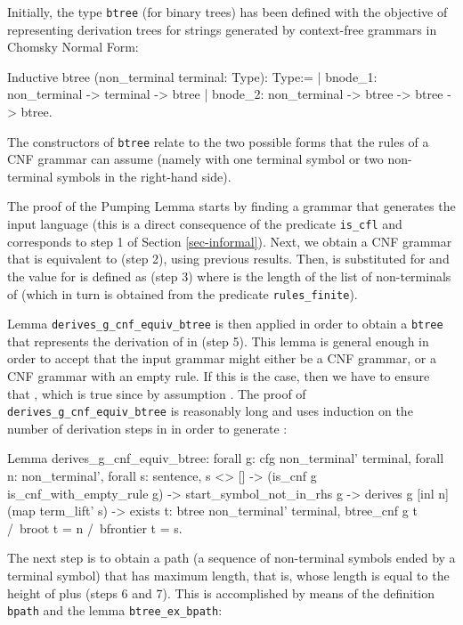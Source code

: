 \documentclass {elsarticle}
\begin{document}
Initially, the type \texttt {btree} (for binary trees) has been defined with the objective of representing derivation trees for strings generated by context-free grammars in Chomsky Normal Form:

\begin{coq}
Inductive btree (non_terminal terminal: Type): Type:=
| bnode_1: non_terminal -> terminal -> btree
| bnode_2: non_terminal -> btree -> btree -> btree.
\end{coq}

The constructors of \texttt {btree} relate to the two possible forms that the rules of a CNF grammar can assume (namely with one terminal symbol or two non-terminal symbols in the right-hand side).

The proof of the Pumping Lemma starts by finding a grammar  that generates the input language  (this is a direct consequence of the predicate \texttt {is\_cfl} and corresponds to step 1 of Section \ref {sec-informal}). Next, we obtain a CNF grammar  that is equivalent to  (step 2), using previous results. Then,  is substituted for  and the value for  is defined as  (step 3) where  is the length of the list of non-terminals of  (which in turn is obtained from the predicate \texttt {rules\_finite}).

Lemma \texttt {derives\_g\_cnf\_equiv\_btree} is then applied in order to obtain a \texttt {btree}  that represents the derivation of  in  (step 5). This lemma is general enough in order to accept that the input grammar might either be a CNF grammar, or a CNF grammar with an empty rule. If this is the case, then we have to ensure that , which is true since by assumption . The proof of \texttt {derives\_g\_cnf\_equiv\_btree} is reasonably long and uses induction on the number of derivation steps in  in order to generate :

\begin{coq}
Lemma derives_g_cnf_equiv_btree:
forall g: cfg non_terminal' terminal,
forall n: non_terminal',
forall s: sentence,
s <> [] ->
(is_cnf g \/ is_cnf_with_empty_rule g) ->
start_symbol_not_in_rhs g ->
derives g [inl n] (map term_lift' s) ->
exists t: btree non_terminal' terminal,
btree_cnf g t /\
broot t = n /\
bfrontier t = s.
\end{coq}

The next step is to obtain a path (a sequence of non-terminal symbols ended by a terminal symbol) that has maximum length, that is, whose length is equal to the height of  plus  (steps 6 and 7). This is accomplished by means of the definition \texttt {bpath} and the lemma \texttt {btree\_ex\_bpath}:
\end{document}
